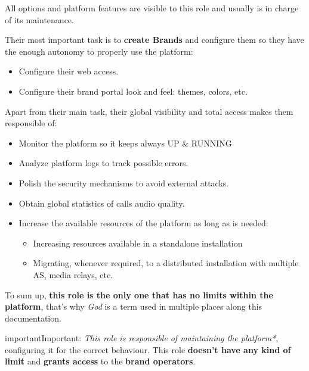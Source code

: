 \documentclass[letterpaper,10pt,english]{sphinxmanual}
\begin{document}
All options and platform features are visible to this role and usually is
in charge of its maintenance.

Their most important task is to \textbf{create Brands} and configure them so
they have the enough autonomy to properly use the platform:
\begin{itemize}
\item {} 
Configure their web access.

\item {} 
Configure their brand portal look and feel: themes, colors, etc.

\end{itemize}

Apart from their main task, their global visibility and total access
makes them responsible of:
\begin{itemize}
\item {} 
Monitor the platform so it keeps always UP \& RUNNING

\item {} 
Analyze platform logs to track possible errors.

\item {} 
Polish the security mechanisms to avoid external attacks.

\item {} 
Obtain global statistics of calls audio quality.

\item {} 
Increase the available resources of the platform as long as is needed:
\begin{itemize}
\item {} 
Increasing resources available in a standalone installation

\item {} 
Migrating, whenever required, to a distributed installation with multiple
AS, media relays, etc.

\end{itemize}

\end{itemize}

To sum up, \textbf{this role is the only one that has no limits within the
platform}, that's why \emph{God} is a term used in multiple places along this
documentation.

\begin{notice}{important}{Important:}
\emph{This role is responsible of maintaining the platform*}, configuring
it for the correct behaviour. This role \textbf{doesn't have any kind
of limit} and \textbf{grants access} to the \textbf{brand operators}.
\end{notice}
\end{document}
